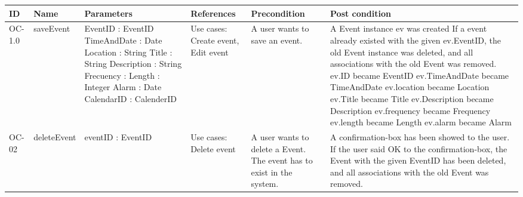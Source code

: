   \begin{table}[ht]
    \begin{tabular}{|l|l|p{90px}|p{50px}|p{90px}|p{90px}|}
        \hline
        ID & Name & Parameters & References & Precondition & Post condition
        \\ \hline
        OC-1.0 & saveEvent 
        &
			EventID : EventID
			TimeAndDate : Date 
			Location : String 
			Title : String 
			Description : String 
			Frecuency : 
			Length : Integer
			Alarm : Date 
			CalendarID : CalenderID
        &
        Use cases: Create event, Edit event
        &
        A user wants to save an event.
        &
        A Event instance ev was created
		If a event already existed with the given ev.EventID, the old Event instance was deleted, and all associations with the old Event was removed.
		ev.ID became EventID
		ev.TimeAndDate became TimeAndDate
		ev.location became Location       
		ev.Title became Title
		ev.Description became Description
		ev.frequency became Frequency        
		ev.length became Length
		ev.alarm became Alarm        
   
        \\ \hline        
        OC-02 & deleteEvent 
        &
        	eventID : EventID
        &
        Use cases: Delete event
        &
        A user wants to delete a Event.
        The event has to exist in the system.
        &
        A confirmation-box has been showed to the user.
        If the user said OK to the confirmation-box, the Event with the given EventID has been deleted, and all associations with the old Event was removed.
        \\ \hline
    \end{tabular}
\end{table}